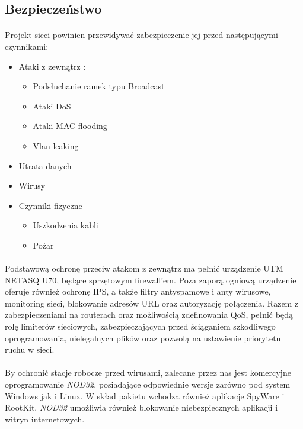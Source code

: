 \subsection{Bezpieczeństwo}
\paragraph{}
Projekt sieci powinien przewidywać zabezpieczenie jej przed następującymi czynnikami:
\begin{itemize}
	\item Ataki z zewnątrz :
	\begin{itemize}
		\item Podsłuchanie ramek typu Broadcast
		\item Ataki DoS
		\item Ataki MAC flooding
		\item Vlan leaking
	\end{itemize}
	\item Utrata danych
	\item Wirusy
	\item Czynniki fizyczne
	\begin{itemize}
		\item Uszkodzenia kabli
		\item Pożar
	\end{itemize}
\end{itemize}

\paragraph{}
Podstawową ochronę przeciw atakom z zewnątrz ma pełnić urządzenie UTM NETASQ U70, będące sprzętowym firewall'em. Poza zaporą ogniową  urządzenie oferuje również ochronę IPS, a także filtry antyspamowe i anty wirusowe, monitoring sieci, blokowanie adresów URL oraz autoryzację połączenia. Razem z zabezpieczeniami na routerach oraz możliwością zdefinowania QoS, pełnić będą rolę limiterów sieciowych, zabezpieczających przed ściąganiem szkodliwego oprogramowania, nielegalnych plików oraz pozwolą na ustawienie priorytetu ruchu w sieci.

\paragraph{}
By ochronić stacje robocze przed wirusami, zalecane przez nas jest komercyjne oprogramowanie \textit{NOD32}, posiadające odpowiednie wersje zarówno pod system Windows jak i Linux. W skład pakietu wchodza również aplikacje SpyWare i RootKit. \textit{NOD32} umożliwia również blokowanie niebezpiecznych aplikacji i witryn internetowych.


